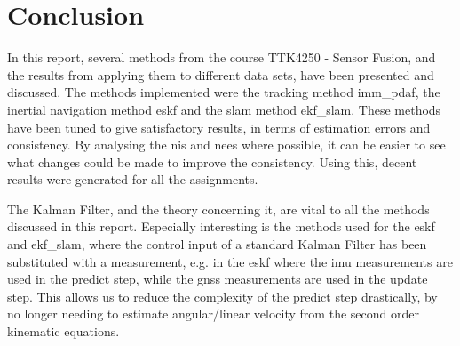 \section{Conclusion}\label{sec:conclusion}
In this report, several methods from the course TTK4250 - Sensor Fusion, and the results from applying them to different data sets, have been presented and discussed. The methods implemented were the tracking method \acrshort{imm_pdaf}, the inertial navigation method \acrshort{eskf} and the \acrshort{slam} method \acrshort{ekf_slam}. These methods have been tuned to give satisfactory results, in terms of estimation errors and consistency. By analysing the \acrshort{nis} and \acrshort{nees} where possible, it can be easier to see what changes could be made to improve the consistency. Using this, decent results were generated for all the assignments. 

The Kalman Filter, and the theory concerning it, are vital to all the methods discussed in this report. Especially interesting is the methods used for the \acrshort{eskf} and \acrshort{ekf_slam}, where the control input of a standard Kalman Filter has been substituted with a measurement, e.g. in the \acrshort{eskf} where the \acrshort{imu} measurements are used in the predict step, while the \acrshort{gnss} measurements are used in the update step. This allows us to reduce the complexity of the predict step drastically, by no longer needing to estimate angular/linear velocity from the second order kinematic equations. 






